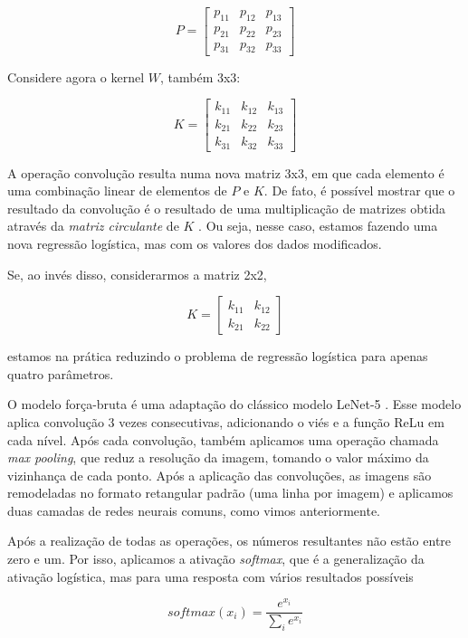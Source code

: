 \documentclass[12pt,]{report}
\begin{document}
\[
P = \left[\begin{array}{rrr}
p_{11} & p_{12} & p_{13} \\ 
p_{21} & p_{22} & p_{23} \\
p_{31} & p_{32} & p_{33}
\end{array}\right]
\]

Considere agora o kernel \(W\), também 3x3:

\[
K = \left[\begin{array}{rrr}
k_{11} & k_{12} & k_{13} \\ 
k_{21} & k_{22} & k_{23} \\
k_{31} & k_{32} & k_{33}
\end{array}\right]
\]

A operação convolução resulta numa nova matriz 3x3, em que cada elemento é uma combinação linear de elementos de \(P\) e \(K\). De fato, é possível mostrar que o resultado da convolução é o resultado de uma multiplicação de matrizes obtida através da \emph{matriz circulante} de \(K\) \citep{gray2006toeplitz}. Ou seja, nesse caso, estamos fazendo uma nova regressão logística, mas com os valores dos dados modificados.

Se, ao invés disso, considerarmos a matriz 2x2,

\[
K = \left[\begin{array}{rr}
k_{11} & k_{12}\\ 
k_{21} & k_{22}
\end{array}\right]
\]

estamos na prática reduzindo o problema de regressão logística para apenas quatro parâmetros.

O modelo força-bruta é uma adaptação do clássico modelo LeNet-5 \citep{lecun2015lenet}. Esse modelo aplica convolução 3 vezes consecutivas, adicionando o viés e a função ReLu em cada nível. Após cada convolução, também aplicamos uma operação chamada \emph{max pooling}, que reduz a resolução da imagem, tomando o valor máximo da vizinhança de cada ponto. Após a aplicação das convoluções, as imagens são remodeladas no formato retangular padrão (uma linha por imagem) e aplicamos duas camadas de redes neurais comuns, como vimos anteriormente.

Após a realização de todas as operações, os números resultantes não estão entre zero e um. Por isso, aplicamos a ativação \emph{softmax}, que é a generalização da ativação logística, mas para uma resposta com vários resultados possíveis

\[
softmax(x_i) = \frac{e^{x_i}}{\sum_ie^{x_i}}
\]
\end{document}
